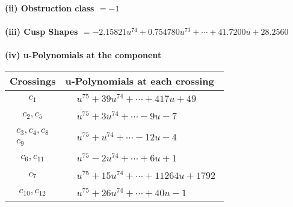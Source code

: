 \documentclass[1p]{elsarticle_modified}
\theoremstyle{definition}
\begin{document}
\flushleft \textbf{(ii) Obstruction class $= -1$}\\~\\
\flushleft \textbf{(iii) Cusp Shapes $= -2.15821 u^{74}+0.754780 u^{73}+\cdots+41.7200 u+28.2560$}\\~\\
\newpage\renewcommand{\arraystretch}{1}
\flushleft \textbf{(iv) u-Polynomials at the component}\newline \\
\begin{tabular}{m{50pt}|m{274pt}}
Crossings & \hspace{64pt}u-Polynomials at each crossing \\
\hline $$\begin{aligned}c_{1}\end{aligned}$$&$\begin{aligned}
&u^{75}+39 u^{74}+\cdots+417 u+49
\end{aligned}$\\
\hline $$\begin{aligned}c_{2},c_{5}\end{aligned}$$&$\begin{aligned}
&u^{75}+3 u^{74}+\cdots-9 u-7
\end{aligned}$\\
\hline $$\begin{aligned}c_{3},c_{4},c_{8}\\c_{9}\end{aligned}$$&$\begin{aligned}
&u^{75}+u^{74}+\cdots-12 u-4
\end{aligned}$\\
\hline $$\begin{aligned}c_{6},c_{11}\end{aligned}$$&$\begin{aligned}
&u^{75}-2 u^{74}+\cdots+6 u+1
\end{aligned}$\\
\hline $$\begin{aligned}c_{7}\end{aligned}$$&$\begin{aligned}
&u^{75}+15 u^{74}+\cdots+11264 u+1792
\end{aligned}$\\
\hline $$\begin{aligned}c_{10},c_{12}\end{aligned}$$&$\begin{aligned}
&u^{75}+26 u^{74}+\cdots+40 u-1
\end{aligned}$\\
\hline
\end{tabular}\\~\\
\end{document}

